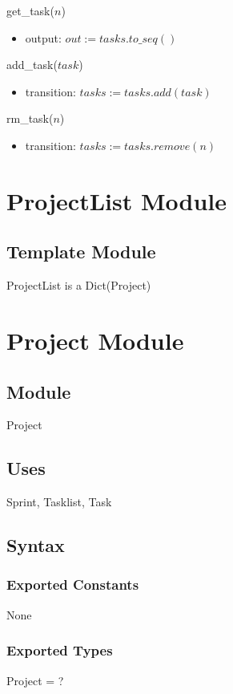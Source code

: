\documentclass[12pt, titlepage]{article}
\begin{document}
\noindent get\_task($n$)
\begin{itemize}
    \item output: $out := tasks.to\_seq()$
\end{itemize}

\noindent add\_task($task$)
\begin{itemize}
    \item transition: $tasks := tasks.add(task)$
\end{itemize}

\noindent rm\_task($n$)
\begin{itemize}
    \item transition: $tasks := tasks.remove(n)$
\end{itemize}

\newpage

\section* {ProjectList Module}

\subsection*{Template Module}
ProjectList is a Dict(Project)

\newpage

\section* {Project Module}

\subsection*{Module}
Project

\subsection* {Uses}
Sprint, Tasklist, Task

\subsection* {Syntax}
\subsubsection* {Exported Constants}
None

\subsubsection* {Exported Types}
Project = ?
\end{document}
